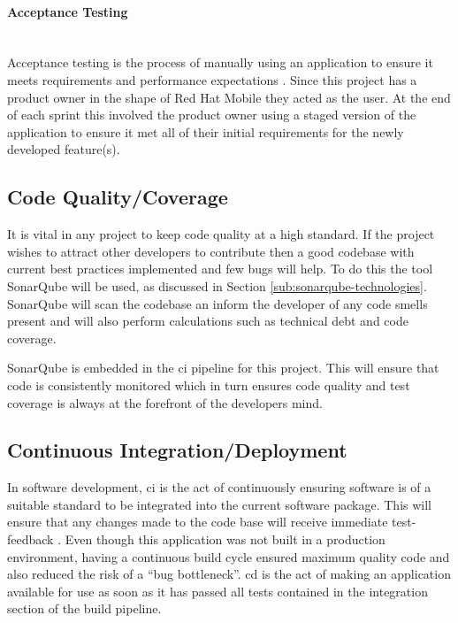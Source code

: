 \paragraph{Acceptance Testing}\mbox{}\\
Acceptance testing is the process of manually using an application to ensure it meets requirements and performance expectations \citep{AcceptanceTesting2017}. Since this project has a product owner in the shape of Red Hat Mobile they acted as the user. At the end of each sprint this involved the product owner using a staged version of the application to ensure it met all of their initial requirements for the newly developed feature(s).

\subsection{Code Quality/Coverage}
\label{sub:code_quality}
It is vital in any project to keep code quality at a high standard. If the project wishes to attract other developers to contribute then a good codebase with current best practices implemented and few bugs will help. To do this the tool SonarQube will be used, as discussed in Section \ref{sub:sonarqube-technologies}. SonarQube will scan the codebase an inform the developer of any \gls{code smell}s present and will also perform calculations such as \gls{technical debt} and \gls{code coverage}. 

SonarQube is embedded in the \gls{ci} pipeline for this project. This will ensure that code is consistently monitored which in turn ensures code quality and test coverage is always at the forefront of the developers mind.

\subsection{Continuous Integration/Deployment}
\label{sub:ci_cd}
In software development, \gls{ci} is the act of continuously ensuring software is of a suitable standard to be integrated into the current software package. This will ensure that any changes made to the code base will receive immediate test-feedback \citep{Fowler2006}. Even though this application was not built in a production environment, having a continuous build cycle ensured maximum quality code and also reduced the risk of a ``bug bottleneck''. \Gls{cd} is the act of making an application available for use as soon as it has passed all tests contained in the integration section of the build pipeline.

